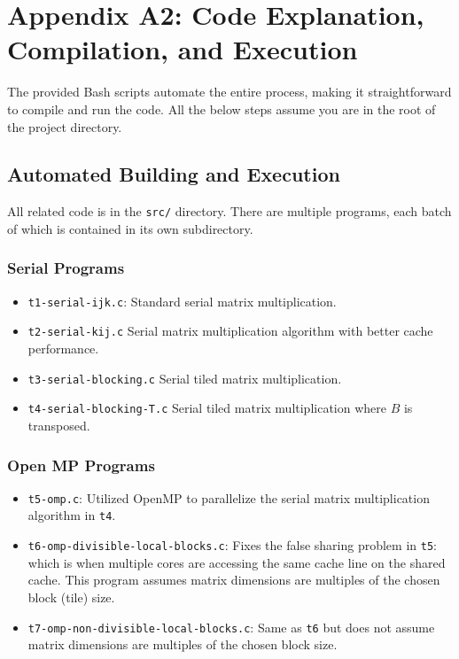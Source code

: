 \documentclass{article}
\begin{document}
\section*{Appendix A2: Code Explanation, Compilation, and Execution}

The provided Bash scripts automate the entire process, 
making it straightforward to compile and run the code. All the below steps assume 
you are in the root of the project directory.

\subsection{Automated Building and Execution}
All related code is in the \texttt{src/} directory.
There are multiple programs, each batch of which is contained in its own subdirectory.
\subsubsection*{Serial Programs}
\begin{itemize}
    \item \texttt{t1-serial-ijk.c}: Standard serial matrix multiplication.
    \item \texttt{t2-serial-kij.c} Serial matrix multiplication algorithm with better cache performance.
    \item \texttt{t3-serial-blocking.c} Serial tiled matrix multiplication.
    \item \texttt{t4-serial-blocking-T.c} Serial tiled matrix multiplication where $B$ is transposed.
\end{itemize}

\subsubsection*{Open MP Programs}
\begin{itemize}
    \item \texttt{t5-omp.c}: Utilized OpenMP to parallelize the serial matrix multiplication algorithm in \texttt{t4}.
    \item \texttt{t6-omp-divisible-local-blocks.c}: Fixes the false sharing problem in \texttt{t5}: which is when 
    multiple cores are accessing the same cache line on the shared cache. This program assumes 
    matrix dimensions are multiples of the chosen block (tile) size.
    \item \texttt{t7-omp-non-divisible-local-blocks.c}: Same as \texttt{t6} but does not assume matrix dimensions are multiples of the chosen block size.
\end{itemize}
\end{document}
